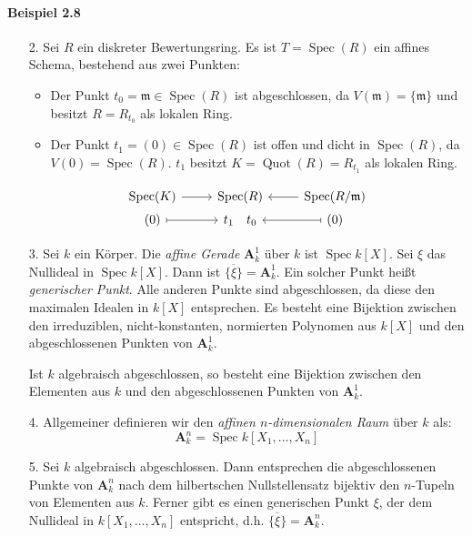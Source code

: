 \paragraph{Beispiel 2.8}\begin{enumerate}
\item[2.] Sei $R$ ein diskreter Bewertungsring. Es ist $T=\operatorname{Spec}(R)$ ein affines Schema, bestehend aus zwei Punkten:
\begin{itemize}
\item Der Punkt $t_0=\mathfrak{m}\in\operatorname{Spec}(R)$ ist abgeschlossen, da $V(\mathfrak{m})=\{\mathfrak{m}\}$ und besitzt $R=R_{t_0}$ als lokalen Ring.
\item Der Punkt $t_1=(0)\in\operatorname{Spec}(R)$ ist offen und dicht in $\operatorname{Spec}(R)$, da $V(0)=\operatorname{Spec}(R)$. $t_1$ besitzt $K=\operatorname{Quot}(R)=R_{t_1}$ als lokalen Ring.
\end{itemize}
\[\begin{tikzcd}[row sep=.1em]
\operatorname{Spec}(K)\ar[r] & \operatorname{Spec}(R) &\ar[l] \operatorname{Spec}(R/\mathfrak{m})\\
(0)\ar[r, mapsto] & t_1\quad t_0 & \ar[l, mapsto] (0)
\end{tikzcd} \]
\item[3.] Sei $k$ ein Körper. Die \textit{affine Gerade} $\mathbf{A}_k^1$ über $k$ ist $\operatorname{Spec}k[X]$. Sei $\xi$ das Nullideal in $\operatorname{Spec}k[X]$. Dann ist $\overline{\{\xi\}}=\mathbf{A}_k^1$. Ein solcher Punkt heißt \textit{generischer Punkt}. Alle anderen Punkte sind abgeschlossen, da diese den maximalen Idealen in $k[X]$ entsprechen. Es besteht eine Bijektion zwischen den irreduziblen, nicht-konstanten, normierten Polynomen aus $k[X]$ und den abgeschlossenen Punkten von $\mathbf{A}_k^1$.

Ist $k$ algebraisch abgeschlossen, so besteht eine Bijektion zwischen den Elementen aus $k$ und den abgeschlossenen Punkten von $\mathbf{A}_k^1$.
\item[4.] Allgemeiner definieren wir den \textit{affinen $n$-dimensionalen Raum} über $k$ als: \[\mathbf{A}_k^n=\operatorname{Spec}k[X_1,\ldots,X_n]\]
\item[5.] Sei $k$ algebraisch abgeschlossen. Dann entsprechen die abgeschlossenen Punkte von $\mathbf{A}_k^n$ nach dem hilbertschen Nullstellensatz bijektiv den $n$-Tupeln von Elementen aus $k$. Ferner gibt es einen generischen Punkt $\xi$, der dem Nullideal in $k[X_1,\ldots,X_n]$ entspricht, d.h. $\overline{\{\xi\}}=\mathbf{A}_k^n$.
\end{enumerate}

